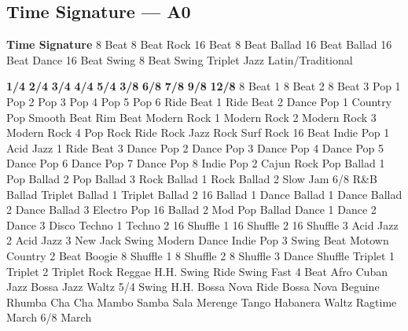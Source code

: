 \subsection{Time Signature --- A0}
\textbf{Time Signature}
8 Beat
8 Beat Rock
16 Beat
8 Beat Ballad
16 Beat Ballad
16 Beat Dance
16 Beat Swing
8 Beat Swing
Triplet
Jazz
Latin/Traditional





























\textbf{1/4}
\textbf{2/4}
\textbf{3/4}
\textbf{4/4}
\textbf{5/4}
\textbf{3/8}
\textbf{6/8}
\textbf{7/8}
\textbf{9/8}
\textbf{12/8}
8 Beat 1
8 Beat 2
8 Beat 3
Pop 1
Pop 2
Pop 3
Pop 4
Pop 5
Pop 6
Ride Beat 1
Ride Beat 2
Dance Pop 1
Country Pop
Smooth Beat
Rim Beat
Modern Rock 1
Modern Rock 2
Modern Rock 3
Modern Rock 4
Pop Rock
Ride Rock
Jazz Rock
Surf Rock
16 Beat
Indie Pop 1
Acid Jazz 1
Ride Beat 3
Dance Pop 2
Dance Pop 3
Dance Pop 4
Dance Pop 5
Dance Pop 6
Dance Pop 7
Dance Pop 8
Indie Pop 2
Cajun Rock
Pop Ballad 1
Pop Ballad 2
Pop Ballad 3
Rock Ballad 1
Rock Ballad 2
Slow Jam
6/8 R\&B Ballad
Triplet Ballad 1
Triplet Ballad 2
16 Ballad 1
Dance Ballad 1
Dance Ballad 2
Dance Ballad 3
Electro Pop
16 Ballad 2
Mod Pop Ballad
Dance 1
Dance 2
Dance 3
Disco
Techno 1
Techno 2
16 Shuffle 1
16 Shuffle 2
16 Shuffle 3
Acid Jazz 2
Acid Jazz 3
New Jack Swing
Modern Dance
Indie Pop 3
Swing Beat
Motown
Country 2 Beat
Boogie
8 Shuffle 1
8 Shuffle 2
8 Shuffle 3
Dance Shuffle
Triplet 1
Triplet 2
Triplet Rock
Reggae
H.H. Swing
Ride Swing
Fast 4 Beat
Afro Cuban
Jazz Bossa
Jazz Waltz
5/4 Swing
H.H. Bossa Nova
Ride Bossa Nova
Beguine
Rhumba
Cha Cha
Mambo
Samba
Sala
Merenge
Tango
Habanera
Waltz
Ragtime
March
6/8 March
